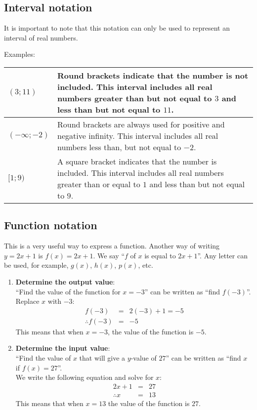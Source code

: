 \subsection*{Interval notation}
It is important to note that this notation can only be used to represent an interval of real numbers.
\par
Examples:
\\
\begin{table}[H]
\begin{tabular}{|p{5cm}|p{8cm}|}
\hline
  $(3;11)$ &  Round brackets indicate that the number is not included. This interval includes all real numbers greater than but not equal to $3$ and less than but not equal to $11$.
\\ \hline
 $(- \infty; -2)$ & Round brackets are always used for positive and negative infinity. This interval includes all real numbers less than, but not equal to $-2$.
\\ \hline
 $[1; 9)$ & A square bracket indicates that the number is included. This interval includes all real numbers greater than or equal to $1$ and less than but not equal to $9$.
\\ \hline
\end{tabular}
\end{table}

\subsection*{Function notation}
This is a very useful way to express a function. Another way of
writing $y=2x+1$ is $f(x) = 2x+1$. We say ``$f$ of $x$ is equal to
$2x+1$''. Any letter can be used, for example, $g(x)$, $h(x)$, $p(x)$, etc. 
\begin{enumerate}[noitemsep, label=\textbf{\arabic*}. ] 
\item \textbf{Determine the output value}: \\
``Find the value of the function for $x=-3$'' can be written as ``find $f(-3)$''.
\\Replace $x$ with $-3$:
\begin{eqnarray*}
  f(-3) & = & 2(-3)+1=-5 \\
  \therefore f(-3) & = & -5
\end{eqnarray*}
This means that when $x=-3$, the value of the function is $-5$.
\item \textbf{Determine the input value}:\\
 ``Find the value of $x$ that will give a $y$-value of $27$'' can be written as ``find $x$ if $f(x)= 27$''. \\
We write the following equation and solve for $x$:
\begin{eqnarray*}
  2x+1 &=& 27 \\
  \therefore x &=& 13
\end{eqnarray*}
This means that when $x=13$ the value of the function is $27$.

\end{enumerate}

